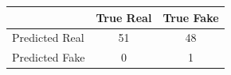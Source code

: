 \begin{tabular}{lcc}
\toprule
 & True Real & True Fake \\
\midrule
Predicted Real & 51 & 48 \\
Predicted Fake & 0 & 1 \\
\bottomrule
\end{tabular}
